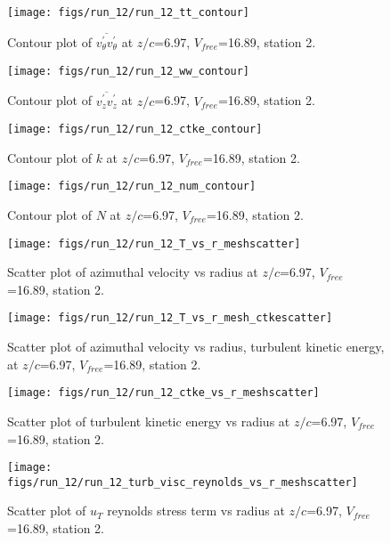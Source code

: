 \begin{figure}[H]
\centering
\texttt{[image: figs/run\_12/run\_12\_tt\_contour]}
\caption{Contour plot of $\overline{v_{\theta}^{\prime} v_{\theta}^{\prime}}$ at $z/c$=6.97, $V_{free}$=16.89, station 2.}
\end{figure}


\begin{figure}[H]
\centering
\texttt{[image: figs/run\_12/run\_12\_ww\_contour]}
\caption{Contour plot of $\overline{v_{z}^{\prime} v_{z}^{\prime}}$ at $z/c$=6.97, $V_{free}$=16.89, station 2.}
\end{figure}


\begin{figure}[H]
\centering
\texttt{[image: figs/run\_12/run\_12\_ctke\_contour]}
\caption{Contour plot of $k$ at $z/c$=6.97, $V_{free}$=16.89, station 2.}
\end{figure}


\begin{figure}[H]
\centering
\texttt{[image: figs/run\_12/run\_12\_num\_contour]}
\caption{Contour plot of $N$ at $z/c$=6.97, $V_{free}$=16.89, station 2.}
\end{figure}


\begin{figure}[H]
\centering
\texttt{[image: figs/run\_12/run\_12\_T\_vs\_r\_meshscatter]}
\caption{Scatter plot of azimuthal velocity vs radius at $z/c$=6.97, $V_{free}$=16.89, station 2.}
\end{figure}


\begin{figure}[H]
\centering
\texttt{[image: figs/run\_12/run\_12\_T\_vs\_r\_mesh\_ctkescatter]}
\caption{Scatter plot of azimuthal velocity vs radius, turbulent kinetic energy, at $z/c$=6.97, $V_{free}$=16.89, station 2.}
\end{figure}


\begin{figure}[H]
\centering
\texttt{[image: figs/run\_12/run\_12\_ctke\_vs\_r\_meshscatter]}
\caption{Scatter plot of turbulent kinetic energy vs radius at $z/c$=6.97, $V_{free}$=16.89, station 2.}
\end{figure}


\begin{figure}[H]
\centering
\texttt{[image: figs/run\_12/run\_12\_turb\_visc\_reynolds\_vs\_r\_meshscatter]}
\caption{Scatter plot of $
u_T$ reynolds stress term vs radius at $z/c$=6.97, $V_{free}$=16.89, station 2.}
\end{figure}


